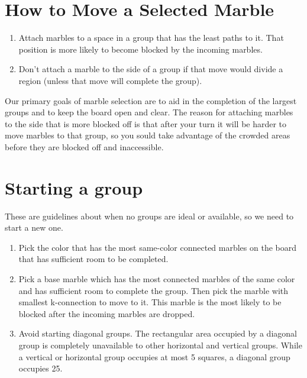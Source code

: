 \documentclass[a4paper,12pt]{article}
\begin{document}
\section*{How to Move a Selected Marble}

\begin{enumerate}[1)]
    \item Attach marbles to a space in a  group that has the least
      paths to it. That position is more likely to become blocked by the
      incoming marbles.
    \item Don't attach a marble to the side of a group if that move
      would divide a region (unless that move will complete the group).
      
\end{enumerate}

Our primary goals of marble selection are to aid in the completion of
the largest groups and to keep the board open and clear. The reason
for attaching marbles to the side that is more blocked off is that
after your turn it will be harder to move marbles to that group, so
you sould take advantage of the crowded areas before they are blocked
off and inaccessible.

\section*{Starting a group}

These are guidelines about when no groups are ideal or available, so we need to start a new one.

\begin{enumerate}[1)]
    
    \item Pick the color that has the most same-color connected
      marbles on the board that has sufficient room to be completed.
    \item Pick a base marble which has the most connected marbles of
      the same color and  has sufficient room to complete the
      group. Then pick the marble with smallest k-connection to move
      to it. This marble is the most likely to be blocked after the
      incoming marbles are dropped.
    \item Avoid starting diagonal groups. The rectangular area
      occupied by a diagonal group is completely unavailable to other
      horizontal and vertical groups. While a vertical or horizontal
      group occupies at most 5 squares, a diagonal group occupies 25.

\end{enumerate}
\end{document}
